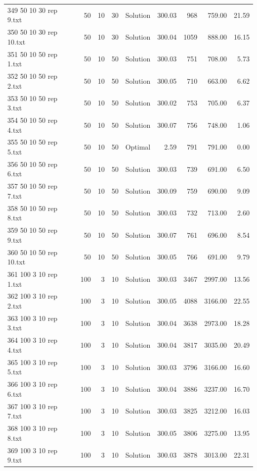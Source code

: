 \begin{longtable}{lrrllrrrr}
349 50 10 30 rep 9.txt & 50 & 10 & 30 & Solution & 300.03 & 968 & 759.00 & 21.59\\
350 50 10 30 rep 10.txt & 50 & 10 & 30 & Solution & 300.04 & 1059 & 888.00 & 16.15\\
351 50 10 50 rep 1.txt & 50 & 10 & 50 & Solution & 300.03 & 751 & 708.00 &  5.73\\
352 50 10 50 rep 2.txt & 50 & 10 & 50 & Solution & 300.05 & 710 & 663.00 &  6.62\\
353 50 10 50 rep 3.txt & 50 & 10 & 50 & Solution & 300.02 & 753 & 705.00 &  6.37\\
354 50 10 50 rep 4.txt & 50 & 10 & 50 & Solution & 300.07 & 756 & 748.00 &  1.06\\
355 50 10 50 rep 5.txt & 50 & 10 & 50 & Optimal &  2.59 & 791 & 791.00 &  0.00\\
356 50 10 50 rep 6.txt & 50 & 10 & 50 & Solution & 300.03 & 739 & 691.00 &  6.50\\
357 50 10 50 rep 7.txt & 50 & 10 & 50 & Solution & 300.09 & 759 & 690.00 &  9.09\\
358 50 10 50 rep 8.txt & 50 & 10 & 50 & Solution & 300.03 & 732 & 713.00 &  2.60\\
359 50 10 50 rep 9.txt & 50 & 10 & 50 & Solution & 300.07 & 761 & 696.00 &  8.54\\
360 50 10 50 rep 10.txt & 50 & 10 & 50 & Solution & 300.05 & 766 & 691.00 &  9.79\\
361 100 3 10 rep 1.txt & 100 & 3 & 10 & Solution & 300.03 & 3467 & 2997.00 & 13.56\\
362 100 3 10 rep 2.txt & 100 & 3 & 10 & Solution & 300.05 & 4088 & 3166.00 & 22.55\\
363 100 3 10 rep 3.txt & 100 & 3 & 10 & Solution & 300.04 & 3638 & 2973.00 & 18.28\\
364 100 3 10 rep 4.txt & 100 & 3 & 10 & Solution & 300.04 & 3817 & 3035.00 & 20.49\\
365 100 3 10 rep 5.txt & 100 & 3 & 10 & Solution & 300.03 & 3796 & 3166.00 & 16.60\\
366 100 3 10 rep 6.txt & 100 & 3 & 10 & Solution & 300.04 & 3886 & 3237.00 & 16.70\\
367 100 3 10 rep 7.txt & 100 & 3 & 10 & Solution & 300.03 & 3825 & 3212.00 & 16.03\\
368 100 3 10 rep 8.txt & 100 & 3 & 10 & Solution & 300.05 & 3806 & 3275.00 & 13.95\\
369 100 3 10 rep 9.txt & 100 & 3 & 10 & Solution & 300.03 & 3878 & 3013.00 & 22.31\\

\end{longtable}
